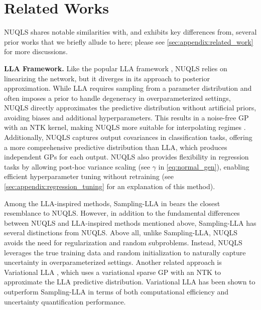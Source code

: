 \section{Related Works}
NUQLS shares notable similarities with, and exhibits key differences from, several prior works that we briefly allude to here; please see \cref{sec:appendix:related_work} for more discussions. 

\noindent
\textbf{LLA Framework.} Like the popular LLA framework \cite{khan2020approximate, foong2019between, immer2021improving, daxberger2021laplace}, NUQLS relies on linearizing the network, but it diverges in its approach to posterior approximation. While LLA requires sampling from a parameter distribution and often imposes a prior to handle degeneracy in overparameterized settings, NUQLS directly approximates the predictive distribution without artificial priors, avoiding biases and additional hyperparameters. This results in a noise-free GP with an NTK kernel, making NUQLS more suitable for interpolating regimes \cite{hodgkinson2023interpolating}. Additionally, NUQLS captures output covariances in classification tasks, offering a more comprehensive predictive distribution than LLA, which produces independent GPs for each output. NUQLS also provides flexibility in regression tasks by allowing post-hoc variance scaling (see $\gamma$ in \cref{eq:normal_gen}), enabling efficient hyperparameter tuning without retraining (see \cref{sec:appendix:regression_tuning} for an explanation of this method). 

Among the LLA-inspired methods, Sampling-LLA in \citet{antoran2022sampling} bears the closest resemblance to NUQLS. However, in addition to
the fundamental differences between NUQLS and LLA-inspired methods mentioned above, Sampling-LLA has several 
distinctions from NUQLS. Above all, unlike Sampling-LLA, NUQLS avoids the need for regularization and random subproblems. Instead, NUQLS leverages the true training data and random initialization to naturally capture uncertainty in overparameterized settings. Another related approach is Variational LLA \citep{ortega2023variational}, which uses a variational sparse GP with an NTK to approximate the LLA predictive distribution. Variational LLA has been shown to outperform Sampling-LLA in terms of both computational efficiency and uncertainty quantification performance.

